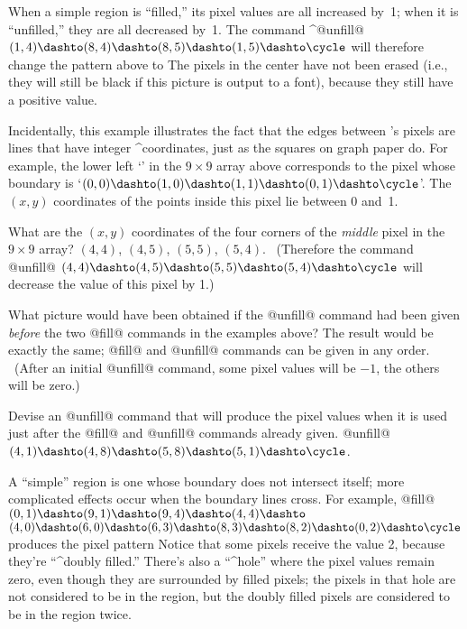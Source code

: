 {{{{When a simple region is ``filled,'' its pixel values are all increased by~1;
when it is ``unfilled,'' they are all decreased by~1. The command
\begindisplay
^@unfill@ $(1,4)\dashto(8,4)\dashto(8,5)\dashto(1,5)\dashto\cycle$
\enddisplay
will therefore change the pattern above to
\cr
\enddisplay
The pixels in the center have not been erased (i.e., they will still be
black if this picture is output to a font), because they still have a
positive value.

Incidentally, this example illustrates the fact that the edges between
\MF's pixels are lines that have integer ^{coordinates}, just as the
squares on graph paper do. For example, the lower left `{}' in
the $9\times9$ array above corresponds to the pixel whose boundary is
`$(0,0)\dashto(1,0)\dashto(1,1)\dashto(0,1)\dashto\cycle$'. The $(x,y)$
coordinates of the points inside this pixel lie between 0 and~1.

\exercise What are the $(x,y)$ coordinates of the four corners of the
{\sl middle\/} pixel in the $9\times9$ array?
\answer $(4,4)$, $(4,5)$, $(5,5)$, $(5,4)$. \ (Therefore the command
\begindisplay
@unfill@ $(4,4)\dashto(4,5)\dashto(5,5)\dashto(5,4)\dashto\cycle$
\enddisplay
will decrease the value of this pixel by 1.)

\exercise What picture would have been obtained if the @unfill@ command
had been given {\sl before\/} the two @fill@ commands in the examples
above?
\answer The result would be exactly the same; @fill@ and @unfill@ commands
can be given in any order. \ (After an initial @unfill@ command, some
pixel values will be $-1$, the others will be zero.)

\exercise Devise an @unfill@ command that will produce the pixel values
\cr
\enddisplay
when it is used just after the @fill@ and @unfill@ commands already given.
\answer @unfill@ $(4,1)\dashto(4,8)\dashto(5,8)\dashto(5,1)\dashto\cycle$.

A ``simple'' region is one whose boundary does not intersect itself; more
complicated effects occur when the boundary lines cross. For example,
\begindisplay
@fill@ $(0,1)\dashto(9,1)\dashto(9,4)\dashto(4,4)\dashto$\cr
\indent$(4,0)\dashto(6,0)\dashto
 (6,3)\dashto(8,3)\dashto(8,2)\dashto(0,2)\dashto\cycle$\cr
\enddisplay
produces the pixel pattern
\cr
\enddisplay
Notice that some pixels receive the value 2, because they're ``^{doubly
filled}.'' There's also a ``^{hole}'' where the pixel values remain zero,
even though they are surrounded by filled pixels; the pixels in that hole
are not considered to be in the region, but the doubly filled pixels
are considered to be in the region twice.

}}}}
